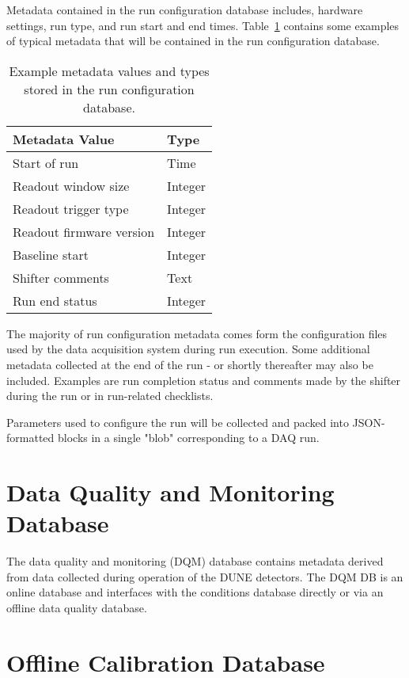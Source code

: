 Metadata contained in the run configuration database includes, hardware settings, run type, and run start and end times. Table~\ref{table:runconfig} contains some examples of typical metadata that will be contained in the run configuration database. 

\begin{table}[h!]
\centering
 \begin{tabular}{||l| l ||} 
 \hline
 Metadata Value & Type  \\ [0.5ex] 
 \hline\hline
Start of run   &  Time \\ \hline
Readout window size  & Integer  \\ \hline
Readout trigger type  &  Integer \\ \hline
Readout firmware version &  Integer \\ \hline
Baseline start &  Integer \\ \hline
Shifter comments &  Text \\ \hline
Run end status & Integer \\ [1ex] 
\hline
\end{tabular}
\caption{Example metadata values and types stored in the run configuration database.}
\label{table:runconfig}
\end{table}

The majority of run configuration metadata comes form the configuration files used by the data acquisition system during run execution. Some additional metadata collected at the end of the run - or shortly thereafter may also be included. Examples are run completion status and comments made by the shifter during the run or in run-related checklists.

Parameters used to configure the run will be collected and packed into JSON-formatted blocks in a single "blob" corresponding to a DAQ run.   

\section{Data Quality and Monitoring Database}
\label{sec:db:dqm}  

The data quality and monitoring (DQM) database contains metadata derived from data collected during operation of the DUNE detectors. The DQM DB is an online database and interfaces with the conditions database directly or via an offline data quality database.

\section{Offline Calibration Database}
\label{sec:db:calib} 

